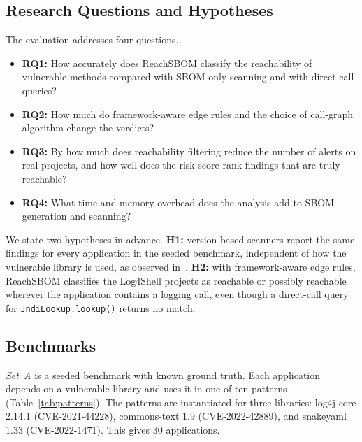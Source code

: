 \documentclass[conference]{IEEEtran}
\begin{document}
\subsection{Research Questions and Hypotheses}
The evaluation addresses four questions.
\begin{itemize}
\item \textbf{RQ1:} How accurately does ReachSBOM classify the reachability of vulnerable methods compared with SBOM-only scanning and with direct-call queries?
\item \textbf{RQ2:} How much do framework-aware edge rules and the choice of call-graph algorithm change the verdicts?
\item \textbf{RQ3:} By how much does reachability filtering reduce the number of alerts on real projects, and how well does the risk score rank findings that are truly reachable?
\item \textbf{RQ4:} What time and memory overhead does the analysis add to SBOM generation and scanning?
\end{itemize}

We state two hypotheses in advance. \textbf{H1:} version-based scanners report the same findings for every application in the seeded benchmark, independent of how the vulnerable library is used, as observed in~\cite{grgic}. \textbf{H2:} with framework-aware edge rules, ReachSBOM classifies the Log4Shell projects as reachable or possibly reachable wherever the application contains a logging call, even though a direct-call query for \texttt{JndiLookup.lookup()} returns no match.

\subsection{Benchmarks}
\emph{Set~A} is a seeded benchmark with known ground truth. Each application depends on a vulnerable library and uses it in one of ten patterns (Table~\ref{tab:patterns}). The patterns are instantiated for three libraries: log4j-core 2.14.1 (CVE-2021-44228), commons-text 1.9 (CVE-2022-42889), and snakeyaml 1.33 (CVE-2022-1471). This gives 30 applications.
\end{document}
